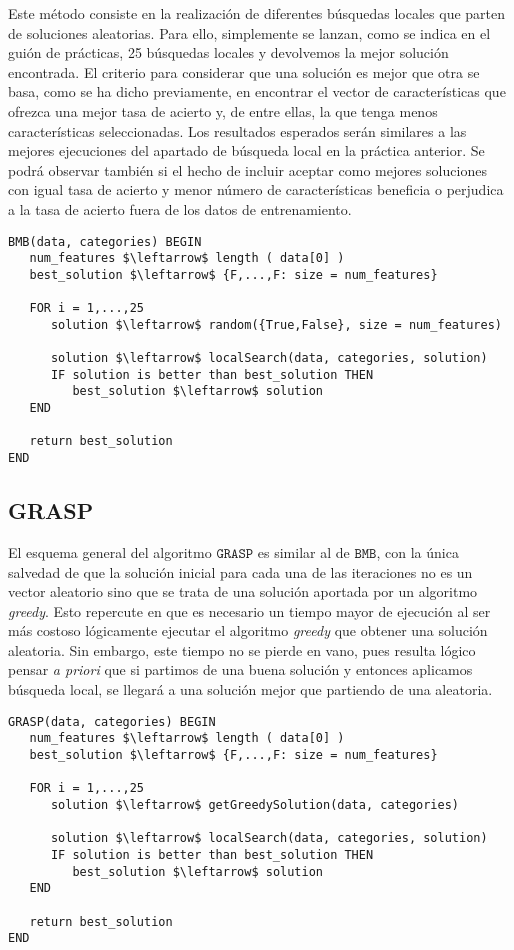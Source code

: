 \documentclass[11pt,leqno]{article}
\begin{document}
Este método consiste en la realización de diferentes búsquedas locales que parten de soluciones aleatorias. Para ello, simplemente se lanzan, como se indica en el guión de prácticas, 25 búsquedas locales y devolvemos la mejor solución encontrada. El criterio para considerar que una solución es mejor que otra se basa, como se ha dicho previamente, en encontrar el vector de características que ofrezca una mejor tasa de acierto y, de entre ellas, la que tenga menos características seleccionadas. Los resultados esperados serán similares a las mejores ejecuciones del apartado de búsqueda local en la práctica anterior. Se podrá observar también si el hecho de incluir aceptar como mejores soluciones con igual tasa de acierto y menor número de características beneficia o perjudica a la tasa de acierto fuera de los datos de entrenamiento.

	\newpage \begin{lstlisting}[mathescape=true]
BMB(data, categories) BEGIN	
   num_features $\leftarrow$ length ( data[0] )
   best_solution $\leftarrow$ {F,...,F: size = num_features}
   
   FOR i = 1,...,25
      solution $\leftarrow$ random({True,False}, size = num_features)
                                   
      solution $\leftarrow$ localSearch(data, categories, solution)
      IF solution is better than best_solution THEN
         best_solution $\leftarrow$ solution
   END
	
   return best_solution
END
	\end{lstlisting}

\subsection{GRASP}

	El esquema general del algoritmo $\texttt{GRASP}$ es similar al de $\texttt{BMB}$, con la única salvedad de que la solución inicial para cada una de las iteraciones no es un vector aleatorio sino que se trata de una solución aportada por un algoritmo \textit{greedy}. Esto repercute en que es necesario un tiempo mayor de ejecución al ser más costoso lógicamente ejecutar el algoritmo \textit{greedy} que obtener una solución aleatoria. Sin embargo, este tiempo no se pierde en vano, pues resulta lógico pensar \textit{a priori} que si partimos de una buena solución y entonces aplicamos búsqueda local, se llegará a una solución mejor que partiendo de una aleatoria.
	
		\begin{lstlisting}[mathescape=true]
GRASP(data, categories) BEGIN	
   num_features $\leftarrow$ length ( data[0] )
   best_solution $\leftarrow$ {F,...,F: size = num_features}
   
   FOR i = 1,...,25
      solution $\leftarrow$ getGreedySolution(data, categories)
                                   
      solution $\leftarrow$ localSearch(data, categories, solution)
      IF solution is better than best_solution THEN
         best_solution $\leftarrow$ solution
   END
	
   return best_solution
END
	\end{lstlisting}
	
\end{document}
